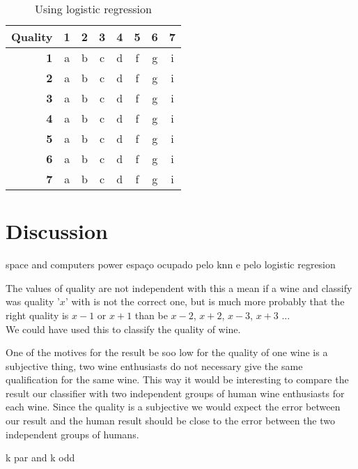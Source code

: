 \documentclass[twoside]{article}
\begin{document}
\begin{multicols}{2}
\begin{table}[H]
\caption{Using logistic regression}
\centering
\begin{tabular}{r||c|c|c|c|c|c|c}
\textbf{Quality} & \textbf{1} & \textbf{2} & \textbf{3} & \textbf{4} & \textbf{5} & \textbf{6} & \textbf{7}\\
\hline \hline
\textbf{1} & a & b & c & d & f & g & i\\
\hline
\textbf{2} & a & b & c & d & f & g & i\\
\hline
\textbf{3} & a & b & c & d & f & g & i\\
\hline
\textbf{4} & a & b & c & d & f & g & i\\
\hline
\textbf{5} & a & b & c & d & f & g & i\\
\hline
\textbf{6} & a & b & c & d & f & g & i\\
\hline
\textbf{7} & a & b & c & d & f & g & i\\
\end{tabular}
\end{table}



\section{Discussion}

space and computers power
espaço ocupado pelo knn e pelo logistic regresion

The values of quality are not independent with this a mean if a wine and classify was quality '$x$' with is not the correct one, but is much more probably that the right quality is $x-1$ or $x+1$ than be $x-2$, $x+2$, $x-3$, $x+3$ ... \\
We could have used this to classify the quality of wine.


One of the motives for the result be soo low for the quality of one wine is a subjective thing, two wine enthusiasts do not necessary give the same qualification for the same wine. This way it would be interesting to compare the result our classifier with two independent groups of human wine enthusiasts for each wine. Since the quality is a subjective we would expect the error between our result and the human result should be close to the error between the two independent groups of humans.





k par and k odd 



\end{multicols}
\end{document}
